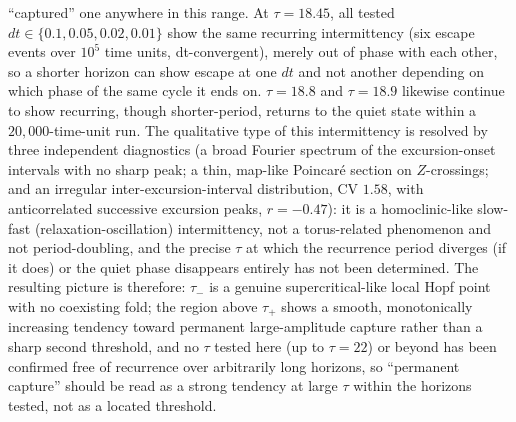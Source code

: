 \documentclass[twocolumn,10pt]{article}
\begin{document}
``captured'' one anywhere in this range. At $\tau=18.45$, all tested $dt\in\{0.1,0.05,0.02,0.01\}$ show the same recurring intermittency (six escape events over $10^5$ time units, dt-convergent), merely out of phase with each other, so a shorter horizon can show escape at one $dt$ and not another depending on which phase of the same cycle it ends on. $\tau=18.8$ and $\tau=18.9$ likewise continue to show recurring, though shorter-period, returns to the quiet state within a $20{,}000$-time-unit run. The qualitative type of this intermittency is resolved by three independent diagnostics (a broad Fourier spectrum of the excursion-onset intervals with no sharp peak; a thin, map-like Poincar\'e section on $Z$-crossings; and an irregular inter-excursion-interval distribution, CV $1.58$, with anticorrelated successive excursion peaks, $r=-0.47$): it is a homoclinic-like slow-fast (relaxation-oscillation) intermittency, not a torus-related phenomenon and not period-doubling, and the precise $\tau$ at which the recurrence period diverges (if it does) or the quiet phase disappears entirely has not been determined. The resulting picture is therefore: $\tau_-$ is a genuine supercritical-like local Hopf point with no coexisting fold; the region above $\tau_+$ shows a smooth, monotonically increasing tendency toward permanent large-amplitude capture rather than a sharp second threshold, and no $\tau$ tested here (up to $\tau=22$) or beyond has been confirmed free of recurrence over arbitrarily long horizons, so ``permanent capture'' should be read as a strong tendency at large $\tau$ within the horizons tested, not as a located threshold.
\end{document}
